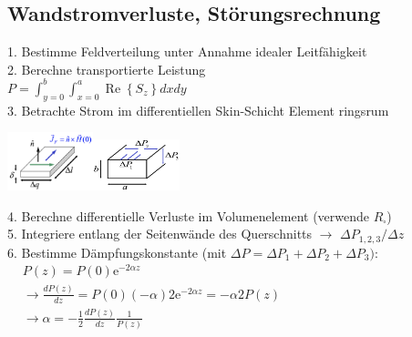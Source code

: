 \documentclass[english]{latex4ei/latex4ei_sheet}
\begin{document}
\begin{sectionbox}
	\subsection{Wandstromverluste, Störungsrechnung}
	1. Bestimme Feldverteilung unter Annahme idealer Leitfähigkeit\\
	2. Berechne transportierte Leistung\\
	$P=\int_{y=0}^{b} \int_{x=0}^{a} \operatorname{Re}\left\{S_{z}\right\} d x d y$\\
	3. Betrachte Strom im differentiellen Skin-Schicht Element ringsrum
	\begin{center}\includegraphics[width = 2.5cm]{./img/verluste-hl.png}\includegraphics[width = 2.5cm]{./img/hl-verluste2.png}\end{center}
	4. Berechne differentielle Verluste im Volumenelement (verwende $R_{\square}$)\\
	5. Integriere entlang der Seitenwände des Querschnitts $\rightarrow$ $\Delta P_{1,2,3} / \Delta z$\\
	6. Bestimme Dämpfungskonstante (mit $\Delta P = \Delta P_{1}+\Delta P_{2}+\Delta P_{3})$:\\ 
	$\begin{aligned}
		&P(z)=P(0) \mathrm{e}^{-2 \alpha z} \\
		&\rightarrow \frac{d P(z)}{d z}=P(0)(-\alpha) 2 \mathrm{e}^{-2 \alpha z}=-\alpha 2 P(z) \\
		&\rightarrow \alpha=-\frac{1}{2} \frac{d P(z)}{d z} \frac{1}{P(z)}
		\end{aligned}$\\


\end{sectionbox}
\end{document}

